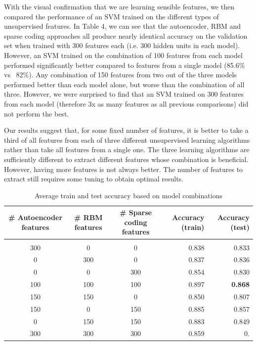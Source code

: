 \documentclass{article} %
\begin{document}
With the visual confirmation that we are learning sensible features, we then compared the performance of an SVM trained on the different types of unsupervised features. In Table 4, we can see that the autoencoder, RBM and sparse coding approaches all produce nearly identical accuracy on the validation set when trained with 300 features each (i.e. 300 hidden units in each model). However, an SVM trained on the combination of 100 features from each model performed significantly better compared to features from a single model (85.6\% vs ~82\%). Any combination of 150 features from two out of the three models performed better than each model alone, but worse than the combination of all three. However, we were surprised to find that an SVM trained on 300 features from each model (therefore 3x as many features as all previous comparisons) did not perform the best. 

Our results suggest that, for some fixed number of features, it is better to take a third of all features from each of three different unsupervised learning algorithms rather than take all features from a single one. The three learning algorithms are sufficiently different to extract different features whose combination is beneficial. However, having more features is not always better. The number of features to extract still requires some tuning to obtain optimal results.




\begin{table}[h]
\caption{Average train and test accuracy based on model combinations}
\label{results-table}
\begin{center}
\begin{adjustbox}{width=1\textwidth}
\begin{tabular}{ccc|rr}

\multicolumn{1}{c}{\bf \# Autoencoder features}  
&\multicolumn{1}{c}{\bf \# RBM features}  
&\multicolumn{1}{c}{\bf \# Sparse coding features} 
&\multicolumn{1}{|r}{\bf Accuracy (train)}
&\multicolumn{1}{r}{\bf Accuracy (test)}
\\ \hline \\	
300 & 0 & 0 & 0.838 & 0.833 \\
0 & 300 & 0 & 0.837 & 0.836 \\
0 & 0 & 300 & 0.854 & 0.830  \\
100 & 100 & 100 & 0.897 & \textbf{0.868} \\
150 & 150 & 0 & 0.850 & 0.807 \\
150 & 0 & 150 & 0.885 & 0.857 \\
0 & 150 & 150 & 0.883& 0.849 \\
300 & 300 & 300 & 0.859 & 0. \\

\end{tabular}
\end{adjustbox}
\end{center}
\end{table}
\end{document}
